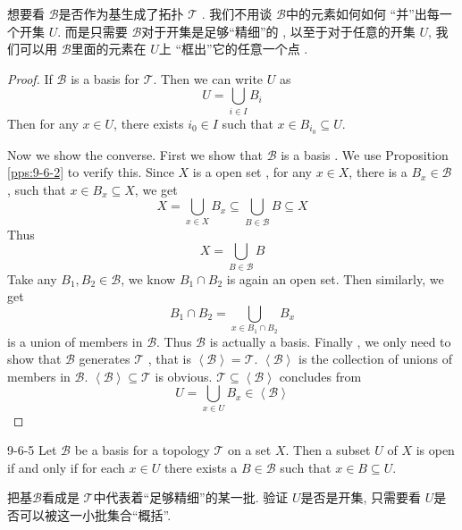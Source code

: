 \documentclass[../main.tex]{subfiles}
\begin{document}
\begin{note}
    想要看 \(  \mathcal{B}  \)是否作为基生成了拓扑 \(  \mathcal{T}  \)  . 我们不用谈 \(  \mathcal{B}  \)中的元素如何如何 ``并''出每一个开集 \(  U  \). 而是只需要 \(  \mathcal{B}  \)对于开集是足够``精细''的 , 以至于对于任意的开集 \(  U  \),  我们可以用 \(  \mathcal{B}  \)里面的元素在 \(  U  \)上 ``框出''它的任意一个点 .   
\end{note}
\begin{proof}
    If \(  \mathcal{B} \)  is a basis for \(  \mathcal{T}  \). Then we can write \(  U  \) as \[
    U = \bigcup _{ i \in I}B_{i}
    \]   Then for any \(  x \in U  \), there exists \(  i_0 \in I  \) such that \(  x \in B_{i_0} \subseteq U  \).
    
    Now we show the converse. First we show that \(  \mathcal{B}  \) is a basis . We use Proposition \ref{pps:9-6-2} to verify this. Since \(  X  \) is a open set , for any \(  x \in X  \), there is a \(  B_{x} \in \mathcal{B}  \) , such that \(  x\in B_{x}\subseteq X  \), we get \[
    X= \bigcup _{x \in X}B_{x}\subseteq  \bigcup _{B\in \mathcal{B}}B \subseteq X
    \]     Thus \[
    X = \bigcup _{B\in \mathcal{B}}B
    \] Take any \(  B_1,B_2 \in \mathcal{B}  \), we know \(  B_1\cap B_2  \) is again an open set. Then similarly, we get \[
    B_1\cap B_2= \bigcup _{x \in B_1\cap B_2}B_{x}
    \]  is a union of members in \(  \mathcal{B}  \). Thus \(  \mathcal{B}  \) is actually a basis. Finally , we only need to show that  \(  \mathcal{B}  \) generates \(  \mathcal{T}  \) , that is \(  \left<\mathcal{B} \right>= \mathcal{T}  \). \(  \left<\mathcal{B} \right>  \) is the collection of unions of members in \(  \mathcal{B}  \). \(  \left<\mathcal{B} \right>\subseteq \mathcal{T}  \) is obvious. \(  \mathcal{T}\subseteq \left<\mathcal{B} \right>  \) concludes from \[
    U = \bigcup _{x \in U}B_{x} \in \left<\mathcal{B} \right>
    \]        
\end{proof}

\begin{proposition}{}{9-6-5}
Let $\mathcal{B}$ be a basis for a topology $\mathcal{T}$ on a set $X$. Then a subset $U$ of $X$ is open if and only if for each $x \in U$ there exists a $B \in \mathcal{B}$ such that $x \in B \subseteq U$.
\end{proposition}
\begin{note}
    把基\(  \mathcal{B}  \)看成是 \(  \mathcal{T}  \)中代表着``足够精细''的某一批.  
    验证 \(  U  \)是否是开集, 只需要看   \(  U  \)是否可以被这一小批集合``概括''. 
\end{note}
\end{document}
